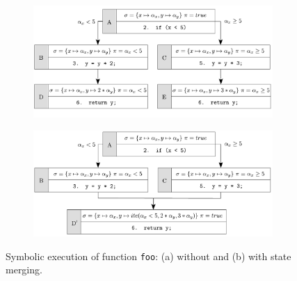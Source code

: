 \begin{figure}[t]
  \vspace{-3mm}
  \centering
  \begin{subfigure}{.5\textwidth}
    \centering
    \hspace{-5mm}
    \includegraphics[width=1.05\columnwidth]{images/state-merging} 
    \vspace{-6.5mm}
    \caption{}
  \end{subfigure}%
  \begin{subfigure}{.5\textwidth}
    \centering
    \includegraphics[width=1.05\columnwidth]{images/state-merging-2} 
    \vspace{-4mm}
    \caption{}
  \end{subfigure}
  \vspace{-3mm}
  \caption{Symbolic execution of function \texttt{foo}: (a) without and (b) with state merging.}
  \label{fig:example-state-merging}
\end{figure}

